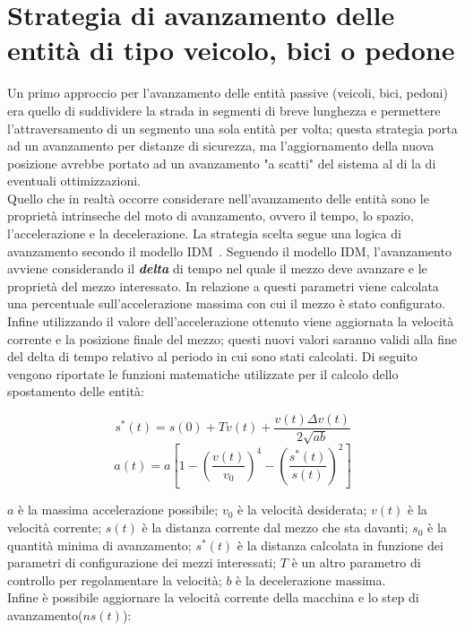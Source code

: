 \section{Strategia di avanzamento delle entità di tipo veicolo, bici o pedone}
Un primo approccio per l'avanzamento delle entità passive (veicoli, bici, pedoni) era quello di suddividere la strada in segmenti di breve lunghezza e permettere l'attraversamento di un segmento una sola entità per volta; questa strategia porta ad un avanzamento per distanze di sicurezza, ma l'aggiornamento della nuova posizione avrebbe portato ad un avanzamento "a scatti" del sistema al di la di eventuali ottimizzazioni. \\
Quello che in realtà occorre considerare nell'avanzamento delle entità sono le
proprietà intrinseche del moto di avanzamento, ovvero il tempo, lo spazio,
l'accelerazione  e la decelerazione. La strategia scelta segue una logica di
avanzamento secondo il modello \ac{IDM}~\cite{treiber2000microscopic}.
Seguendo il modello \ac{IDM}, l'avanzamento avviene considerando il
\textbf{\textit{delta}} di tempo nel quale il mezzo deve avanzare e le proprietà del mezzo interessato. In relazione a questi parametri viene calcolata una percentuale sull'accelerazione massima con cui il mezzo è stato configurato. Infine utilizzando il valore dell'accelerazione ottenuto viene aggiornata la velocità corrente e la posizione finale del mezzo; questi nuovi valori saranno validi alla fine del delta di tempo relativo al periodo in cui sono stati calcolati. Di seguito vengono riportate le funzioni matematiche utilizzate per il calcolo dello spostamento delle entità:

\begin{equation}
s^{*}(t)=s(0)+Tv(t)+\frac{v(t)\Delta{v(t)}}{2\sqrt{ab}}
\end{equation}
\begin{equation}
a(t)=a[1-(\frac{v(t)}{v_{0}})^4-(\frac{s^{*}(t)}{s(t)})^2]
\end{equation}

$a$ è la massima accelerazione possibile; $v_{0}$ è la velocità desiderata; $v(t)$ è la velocità corrente; $s(t)$ è la distanza corrente dal mezzo che sta davanti; $s_{0}$ è la quantità minima di avanzamento; $s^*(t)$ è la distanza calcolata in funzione dei parametri di configurazione dei mezzi interessati; $T$ è un altro parametro di controllo per regolamentare la velocità; $b$ è la decelerazione massima.\\
Infine è possibile aggiornare la velocità corrente della macchina e lo step di avanzamento($ns(t)$): \\

